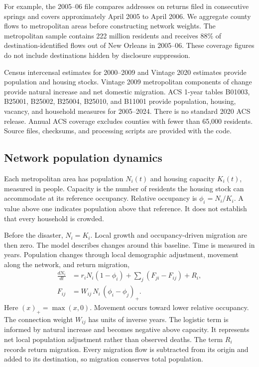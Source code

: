 \documentclass[11pt]{article}
\begin{document}
For example, the 2005--06 file compares addresses on returns filed in consecutive springs and covers approximately April 2005 to April 2006. We aggregate county flows to metropolitan areas before constructing network weights. The metropolitan sample contains 222 million residents and receives 88\% of destination-identified flows out of New Orleans in 2005--06. These coverage figures do not include destinations hidden by disclosure suppression.

Census intercensal estimates for 2000--2009 and Vintage 2020 estimates provide population and housing stocks. Vintage 2009 metropolitan components of change provide natural increase and net domestic migration. ACS 1-year tables B01003, B25001, B25002, B25004, B25010, and B11001 provide population, housing, vacancy, and household measures for 2005--2024. There is no standard 2020 ACS release. Annual ACS coverage excludes counties with fewer than 65{,}000 residents. Source files, checksums, and processing scripts are provided with the code.

\subsection*{Network population dynamics}

Each metropolitan area has population $N_i(t)$ and housing capacity $K_i(t)$, measured in people. Capacity is the number of residents the housing stock can accommodate at its reference occupancy. Relative occupancy is $\phi_i=N_i/K_i$. A value above one indicates population above that reference. It does not establish that every household is crowded.

Before the disaster, $N_i=K_i$. Local growth and occupancy-driven migration are then zero. The model describes changes around this baseline. Time is measured in years. Population changes through local demographic adjustment, movement along the network, and return migration,
\begin{equation}
\begin{aligned}
\frac{dN_i}{dt} &= r_i N_i (1-\phi_i) + \sum_j\left(F_{ji}-F_{ij}\right) + R_i, \\
F_{ij} &= W_{ij}\,N_i\,(\phi_i-\phi_j)_+ .
\end{aligned}
\label{eq:N}
\end{equation}
Here $(x)_+=\max(x,0)$. Movement occurs toward lower relative occupancy. The connection weight $W_{ij}$ has units of inverse years. The logistic term is informed by natural increase and becomes negative above capacity. It represents net local population adjustment rather than observed deaths. The term $R_i$ records return migration. Every migration flow is subtracted from its origin and added to its destination, so migration conserves total population.
\end{document}

